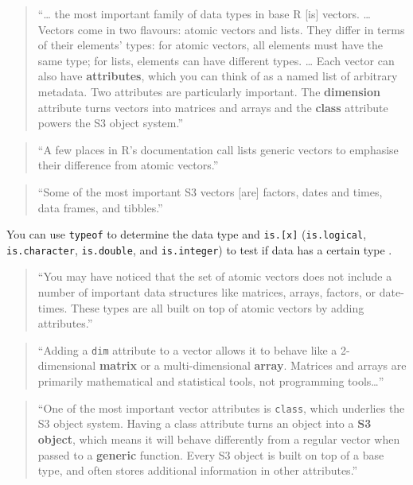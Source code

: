 \documentclass[]{tufte-book}
\begin{document}
\begin{quote}
``\ldots{} the most important family of data types in base R {[}is{]} vectors. \ldots{}
Vectors come in two flavours: atomic vectors and lists. They differ in terms of
their elements' types: for atomic vectors, all elements must have the
same type; for lists, elements can have different types. \ldots{}
Each vector can also have \textbf{attributes}, which you can think of as a
named list of arbitrary metadata. Two attributes are particularly important.
The \textbf{dimension} attribute turns vectors into matrices and arrays and
the \textbf{class} attribute powers the S3 object system.'' \citep{wickham2019advanced}
\end{quote}

\begin{quote}
``A few places in R's documentation call lists generic vectors to emphasise
their difference from atomic vectors.'' \citep{wickham2019advanced}
\end{quote}

\begin{quote}
``Some of the most important S3 vectors {[}are{]} factors, dates and times,
data frames, and tibbles.'' \citep{wickham2019advanced}
\end{quote}

You can use \texttt{typeof} to determine the data type and \texttt{is.{[}x{]}} (\texttt{is.logical},
\texttt{is.character}, \texttt{is.double}, and \texttt{is.integer}) to test if data has a certain
type \citep{wickham2019advanced}.

\begin{quote}
``You may have noticed that the set of atomic vectors does not include a
number of important data structures like matrices, arrays, factors, or
date-times. These types are all built on top of atomic vectors by
adding attributes.'' \citep{wickham2019advanced}
\end{quote}

\begin{quote}
``Adding a \texttt{dim} attribute to a vector allows it to behave like a 2-dimensional
\textbf{matrix} or a multi-dimensional \textbf{array}. Matrices and arrays are primarily
mathematical and statistical tools, not programming tools\ldots{}'' \citep{wickham2019advanced}
\end{quote}

\begin{quote}
``One of the most important vector attributes is \texttt{class}, which underlies the
S3 object system. Having a class attribute turns an object into a \textbf{S3 object},
which means it will behave differently from a regular vector when passed to
a \textbf{generic} function. Every S3 object is built on top of a base type, and often
stores additional information in other attributes.'' \citep{wickham2019advanced}
\end{quote}
\end{document}
